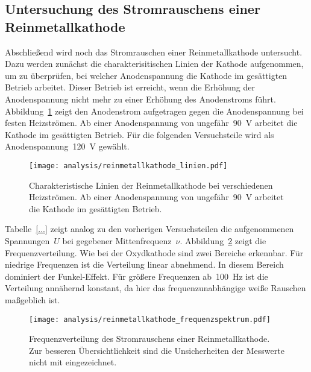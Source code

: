 \subsection{Untersuchung des Stromrauschens einer Reinmetallkathode}

Abschließend wird noch das Stromrauschen einer Reinmetallkathode untersucht.
Dazu werden zunächst die charakterisitischen Linien der Kathode aufgenommen, um
zu überprüfen, bei welcher Anodenspannung die Kathode im gesättigten Betrieb
arbeitet. Dieser Betrieb ist erreicht, wenn die Erhöhung der Anodenspannung
nicht mehr zu einer Erhöhung des Anodenstroms führt.
Abbildung~\ref{fig:reinmetallkathode_linien} zeigt den Anodenstrom aufgetragen
gegen die Anodenspannung bei festen Heizströmen. Ab einer Anodenspannung von
ungefähr~\SI{90}{\volt} arbeitet die Kathode im gesättigten Betrieb. Für die
folgenden Versuchsteile wird als Anodenspannung~\SI{120}{\volt} gewählt.

\begin{figure}[htb]
  \centering
  \texttt{[image: analysis/reinmetallkathode\_linien.pdf]}
  \caption{Charakteristische Linien der Reinmetallkathode bei verschiedenen
  Heizströmen. Ab einer Anodenspannung von ungefähr~\SI{90}{\volt} arbeitet die
  Kathode im gesättigten Betrieb.}
  \label{fig:reinmetallkathode_linien}
\end{figure}

Tabelle~\ref{...} zeigt analog zu den vorherigen Versuchsteilen die
aufgenommenen Spannungen~$U$ bei gegebener Mittenfrequenz~$\nu$.
Abbildung~\ref{fig:reinmetallkathode_frequenzspektrum} zeigt die
Frequenzverteilung. Wie bei der Oxydkathode sind zwei Bereiche erkennbar. Für
niedrige Frequenzen ist die Verteilung linear abnehmend. In diesem Bereich
dominiert der Funkel-Effekt. Für größere Frequenzen ab~\SI{100}{\hertz} ist die
Verteilung annähernd konstant, da hier das frequenzunabhängige weiße Rauschen
maßgeblich ist.

\begin{figure}[htb]
  \centering
  \texttt{[image: analysis/reinmetallkathode\_frequenzspektrum.pdf]}
  \caption{Frequenzverteilung des Stromrauschens einer Reinmetallkathode. Zur
  besseren Übersichtlichkeit sind die Unsicherheiten der Messwerte nicht mit
  eingezeichnet.}
  \label{fig:reinmetallkathode_frequenzspektrum}
\end{figure}

